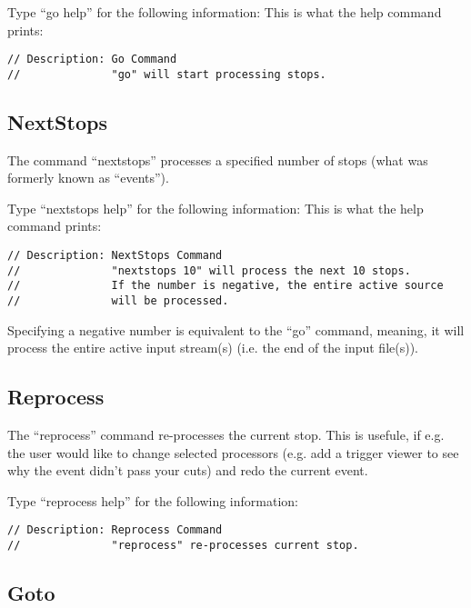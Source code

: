 \documentclass[12pt]{article}
\begin{document}
Type ``go help'' for the following information:
%
This is what the help command prints:
\begin{verbatim}
// Description: Go Command
//              "go" will start processing stops.
\end{verbatim}

\subsection{NextStops }
\label{sec:NextStopsCommand}

The command ``nextstops'' processes a specified number of stops (what
was formerly known as ``events'').

Type ``nextstops help'' for the following information:
%
This is what the help command prints:
\begin{verbatim}
// Description: NextStops Command 
//              "nextstops 10" will process the next 10 stops.
//              If the number is negative, the entire active source 
//              will be processed.
\end{verbatim}

Specifying a negative number is equivalent to the ``go'' command,
meaning, it will process the entire active input stream(s) (i.e. the end
of the input file(s)).

\subsection{Reprocess }
\label{sec:ReprocessCommand}

The ``reprocess'' command re-processes the current stop. This is
usefule, if e.g. the user would like to change selected processors
(e.g. add a trigger viewer to see why the event didn't pass your cuts)
and redo the current event.

Type ``reprocess help'' for the following information:
%
\begin{verbatim}
// Description: Reprocess Command
//              "reprocess" re-processes current stop.
\end{verbatim}

\subsection{Goto }
\label{sec:GotoCommand}
\end{document}
